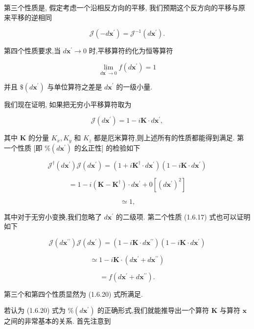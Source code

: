 \documentclass[lang=cn,newtx,10pt,scheme=chinese,thmcnt=section]{elegantbook}
\begin{document}
第三个性质是, 假定考虑一个沿相反方向的平移, 我们预期这个反方向的平移与原来平移的逆相同

$$
\mathcal{J}\left( {-d{\mathbf{x}}^{\prime }}\right) = {\mathcal{J}}^{-1}\left( {d{\mathbf{x}}^{\prime }}\right) . \tag{1.6.18}
$$

第四个性质要求,当 $d{\mathbf{x}}^{\prime } \rightarrow 0$ 时,平移算符约化为恒等算符

$$
\mathop{\lim }\limits_{{d{\mathbf{x}}^{\prime } \rightarrow 0}}f\left( {d{\mathbf{x}}^{\prime }}\right) = 1 \tag{1.6.19}
$$

并且 $\$ \left( {d{\mathbf{x}}^{\prime }}\right)$ 与单位算符之差是 $d{\mathbf{x}}^{\prime }$ 的一级小量.

我们现在证明, 如果把无穷小平移算符取为

$$
\mathcal{J}\left( {d{\mathbf{x}}^{\prime }}\right) = 1 - i\mathbf{K} \cdot d{\mathbf{x}}^{\prime }, \tag{1.6.20}
$$

其中 $\mathbf{K}$ 的分量 ${K}_{x},{K}_{y}$ 和 ${K}_{z}$ 都是厄米算符,则上述所有的性质都能得到满足. 第一个性质 [即 $\% \left( {d{\mathbf{x}}^{\prime }}\right)$ 的幺正性] 的检验如下

$$
{\mathcal{J}}^{ \dagger }\left( {d{\mathbf{x}}^{\prime }}\right) \mathcal{J}\left( {d{\mathbf{x}}^{\prime }}\right) = \left( {1 + i{\mathbf{K}}^{ \dagger } \cdot d{\mathbf{x}}^{\prime }}\right) \left( {1 - i\mathbf{K} \cdot d{\mathbf{x}}^{\prime }}\right)
$$

$$
= 1 - i\left( {\mathbf{K} - {\mathbf{K}}^{ \dagger }}\right) \cdot d{\mathbf{x}}^{\prime } + 0\left\lbrack {\left( d{\mathbf{x}}^{\prime }\right) }^{2}\right\rbrack \tag{1.6.21}
$$

$$
\simeq 1\text{,}
$$

其中对于无穷小变换,我们忽略了 $d{\mathbf{x}}^{\prime }$ 的二级项. 第二个性质 (1.6.17) 式也可以证明如下

$$
\mathcal{J}\left( {d{\mathbf{x}}^{\prime \prime }}\right) \mathcal{J}\left( {d{\mathbf{x}}^{\prime }}\right) = \left( {1 - i\mathbf{K} \cdot d{\mathbf{x}}^{\prime \prime }}\right) \left( {1 - i\mathbf{K} \cdot d{\mathbf{x}}^{\prime }}\right)
$$

$$
\simeq 1 - i\mathbf{K} \cdot \left( {d{\mathbf{x}}^{\prime } + d{\mathbf{x}}^{\prime \prime }}\right) \tag{1.6.22}
$$

$$
= f\left( {d{\mathbf{x}}^{\prime } + d{\mathbf{x}}^{\prime \prime }}\right) .
$$

第三个和第四个性质显然为 (1.6.20) 式所满足.

若认为 (1.6.20) 式为 $\% \left( {d{\mathbf{x}}^{\prime }}\right)$ 的正确形式,我们就能推导出一个算符 $\mathbf{K}$ 与算符 $\mathbf{x}$ 之间的非常基本的关系. 首先注意到
\end{document}
